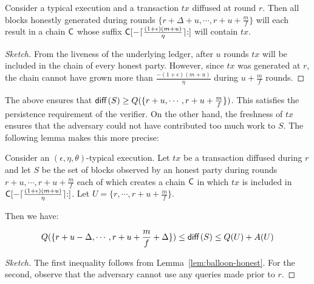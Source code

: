 \begin{lemma}\label{lem:balloon-honest}
Consider a typical execution and a transaction $tx$ diffused at round $r$. Then
all blocks honestly generated during rounds $\{r + \Delta + u, \cdots, r + u + \frac{m}{f}\}$
will each result in a chain $\mathsf{C}$ whose suffix $\mathsf{C}[-\lceil\frac{(1 +
\epsilon)(m + u)}{\eta}\rceil{:}]$ will contain $tx$.
\end{lemma}
\begin{proof}[Sketch]
  From the liveness of the underlying ledger, after $u$ rounds $tx$ will be
  included in the chain of every honest party. However, since $tx$ was generated
  at $r$, the chain cannot have grown more than
  $\frac{-(1 + \epsilon)(m + u)}{\eta}$ during $u + \frac{m}{f}$ rounds.
\end{proof}

The above ensures that
$\operatorname{\textsf{diff}\,}(S) \geq Q(\{r + u, \cdots, r + u + \frac{m}{f}\})$. This satisfies the
persistence requirement of the verifier. On the other hand, the freshness of
$tx$ ensures that the adversary could not have contributed too much work to
$S$. The following lemma makes this more precise:

\begin{lemma}\label{lem:balloon-bounds}
  Consider an $(\epsilon, \eta, \theta)$-typical execution. Let $tx$ be a transaction diffused during $r$
  and let $S$ be the set of blocks observed by an honest
  party during rounds $r + u, \cdots, r + u + \frac{m}{f}$ each of which creates a chain
  $\mathsf{C}$ in which $tx$ is included in $\mathsf{C}[-\lceil\frac{(1 + \epsilon)(m +
  u)}{\eta}\rceil{:}]$. Let $U = \{r, \cdots, r + u + \frac{m}{f}\}$.

  Then we have:

  \[
  Q(\{r + u - \Delta, \cdots, r + u + \frac{m}{f} + \Delta\})
  \leq \operatorname{\textsf{diff}\,}(S) \leq
  Q(U) + A(U)
  \]
\end{lemma}
\begin{proof}[Sketch]
  The first inequality follows from Lemma~\ref{lem:balloon-honest}. For the second,
  observe that the adversary cannot use any queries made prior to $r$.
\end{proof}

